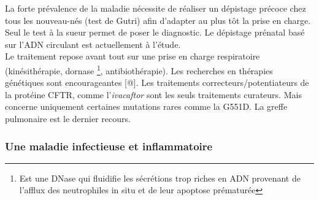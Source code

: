 \documentclass[12pt,a4paper]{article}
\begin{document}
La forte prévalence de la maladie nécessite de réaliser un dépistage précoce chez tous les nouveau-nés (test de Gutri) afin d’adapter au plus tôt la prise en charge. Seul le test à la sueur permet de poser le diagnostic. Le dépistage prénatal basé sur l’ADN circulant est actuellement à l’étude.\\   
Le traitement repose avant tout sur une prise en charge respiratoire (kinésithérapie, dornase \footnote{Est une DNase qui fluidifie les sécrétions trop riches en ADN provenant de l'afflux des neutrophiles in situ et de leur apoptose prématurée}, antibiothérapie). Les recherches en thérapies génétiques sont encourageantes [@].
Les traitements correcteurs/potentiateurs de la protéine CFTR, comme l'\textit{ivacaftor} sont les seuls traitements curateurs. Mais concerne uniquement certaines mutations rares comme la G551D. La greffe pulmonaire est le dernier recours.

\subsubsection{Une maladie infectieuse et inflammatoire}
\end{document}
